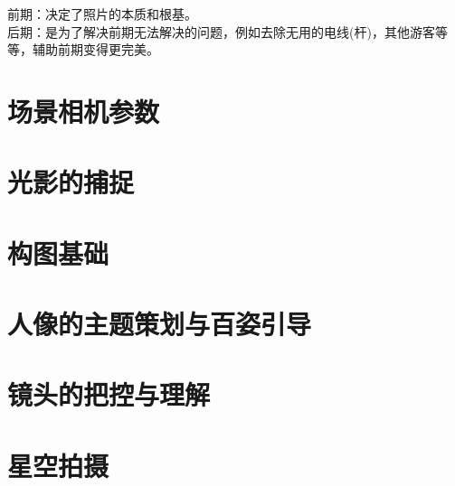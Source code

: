 \documentclass{myartnote}
\begin{document}
前期：决定了照片的本质和根基。\\
后期：是为了解决前期无法解决的问题，例如去除无用的电线(杆)，其他游客等等，辅助前期变得更完美。

\chapter{场景相机参数}
\chapter{光影的捕捉}
\chapter{构图基础}
\chapter{人像的主题策划与百姿引导}
\chapter{镜头的把控与理解}
\chapter{星空拍摄}
\end{document}
